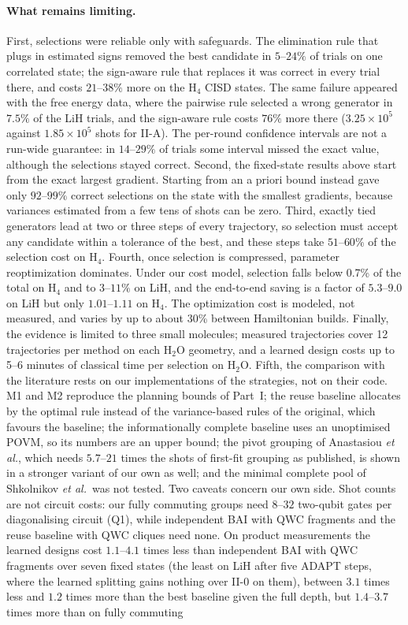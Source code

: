 \documentclass[aps,pra,reprint,superscriptaddress,nofootinbib]{revtex4-2}
\begin{document}
\paragraph{What remains limiting.} First, selections were reliable only with safeguards. The elimination rule that plugs in estimated signs removed the best candidate in $5$--$24\%$ of trials on one correlated state; the sign-aware rule that replaces it was correct in every trial there, and costs $21$--$38\%$ more on the H$_4$ CISD states. The same failure appeared with the free energy data, where the pairwise rule selected a wrong generator in $7.5\%$ of the LiH trials, and the sign-aware rule costs $76\%$ more there ($3.25\times10^{5}$ against $1.85\times10^{5}$ shots for II-A). The per-round confidence intervals are not a run-wide guarantee: in $14$--$29\%$ of trials some interval missed the exact value, although the selections stayed correct. Second, the fixed-state results above start from the exact largest gradient. Starting from an a priori bound instead gave only $92$--$99\%$ correct selections on the state with the smallest gradients, because variances estimated from a few tens of shots can be zero. Third, exactly tied generators lead at two or three steps of every trajectory, so selection must accept any candidate within a tolerance of the best, and these steps take $51$--$60\%$ of the selection cost on H$_4$. Fourth, once selection is compressed, parameter reoptimization dominates. Under our cost model, selection falls below 0.7\% of the total on H$_4$ and to $3$--$11\%$ on LiH, and the end-to-end saving is a factor of $5.3$--$9.0$ on LiH but only $1.01$--$1.11$ on H$_4$. The optimization cost is modeled, not measured, and varies by up to about 30\% between Hamiltonian builds. Finally, the evidence is limited to three small molecules; measured trajectories cover 12 trajectories per method on each H$_2$O geometry, and a learned design costs up to 5--6 minutes of classical time per selection on H$_2$O. Fifth, the comparison with the literature rests on our implementations of the strategies, not on their code. M1 and M2 reproduce the planning bounds of Part~I; the reuse baseline allocates by the optimal rule instead of the variance-based rules of the original, which favours the baseline; the informationally complete baseline uses an unoptimised POVM, so its numbers are an upper bound; the pivot grouping of Anastasiou \textit{et al.}, which needs $5.7$--$21$ times the shots of first-fit grouping as published, is shown in a stronger variant of our own as well; and the minimal complete pool of Shkolnikov \textit{et al.}\ was not tested. Two caveats concern our own side. Shot counts are not circuit costs: our fully commuting groups need $8$--$32$ two-qubit gates per diagonalising circuit (Q1), while independent BAI with QWC fragments and the reuse baseline with QWC cliques need none. On product measurements the learned designs cost $1.1$--$4.1$ times less than independent BAI with QWC fragments over seven fixed states (the least on LiH after five ADAPT steps, where the learned splitting gains nothing over II-0 on them), between $3.1$ times less and $1.2$ times more than the best baseline given the full depth, but $1.4$--$3.7$ times more than on fully commuting 
\end{document}
